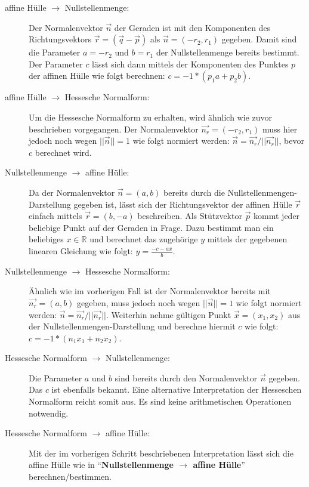 \documentclass[a4paper]{article}
\begin{document}
\begin{description}
 \item[affine Hülle $\rightarrow$ Nullstellenmenge:] 
 Der Normalenvektor $\vec{n}$ der Geraden ist mit den Komponenten des Richtungsvektors $\vec{r} = (\vec{q} - \vec{p})$
 als $\vec{n} = (-r_2, r_1)$ gegeben. Damit sind die Parameter $a = -r_2$ und $b = r_1$  der Nullstellenmenge bereits bestimmt.
 Der Parameter $c$ lässt sich dann mittels der Komponenten des Punktes $p$ der affinen Hülle wie folgt berechnen: $c = -1 * (p_1a + p_2b)$.
 
 \item[affine Hülle $\rightarrow$ Hessesche Normalform:] Um die Hessesche Normalform zu erhalten, wird ähnlich
 wie zuvor beschrieben vorgegangen. Der Normalenvektor $\vec{n_r} = (-r_2, r_1)$ muss hier jedoch noch wegen $||\vec{n}|| = 1$ wie folgt 
 normiert werden: $\vec{n} = \vec{n_r}/||\vec{n_r}||$, bevor $c$ berechnet wird. 
 
 \item[Nullstellenmenge $\rightarrow$ affine Hülle:]
 Da der Normalenvektor $\vec{n} = (a,b)$ bereits durch die Nullstellenmengen-Darstellung gegeben ist, lässt sich der Richtungsvektor
 der affinen Hülle $\vec{r}$
 einfach mittels $\vec{r} = (b,-a)$ beschreiben. Als Stützvektor $\vec{p}$ kommt jeder beliebige Punkt auf der Geraden in Frage. Dazu bestimmt man ein
 beliebiges $x \in \mathbb{R}$ und berechnet das zugehörige $y$ mittels der gegebenen linearen Gleichung wie folgt: $y = \frac{-c -ax}{b}$.
 
 \item[Nullstellenmenge $\rightarrow$ Hessesche Normalform:]
 Ähnlich wie im vorherigen Fall ist der Normalenvektor bereits mit $\vec{n_r} = (a,b)$ gegeben, muss jedoch noch wegen $||\vec{n}|| = 1$ wie folgt 
 normiert werden: $\vec{n} = \vec{n_r}/||\vec{n_r}||$. Weiterhin nehme gültigen Punkt $\vec{x}=(x_1,x_2)$ aus der Nullstellenmengen-Darstellung und berechne
 hiermit $c$ wie folgt: $c = -1 * (n_1x_1 + n_2x_2)$.
 
 \item[Hessesche Normalform $\rightarrow$ Nullstellenmenge:]
 Die Parameter $a$ und $b$ sind bereits durch den Normalenvektor $\vec{n}$ gegeben. Das $c$ ist ebenfalls bekannt. 
 Eine alternative Interpretation der Hesseschen Normalform reicht somit aus. Es sind keine arithmetischen Operationen notwendig. 
 
 \item[Hessesche Normalform $\rightarrow$ affine Hülle:]
 Mit der im vorherigen Schritt beschriebenen Interpretation lässt sich die affine Hülle wie in "`\textbf{Nullstellenmenge $\rightarrow$ affine Hülle}"'
 berechnen/bestimmen. 
 
\end{description}
\end{document}
